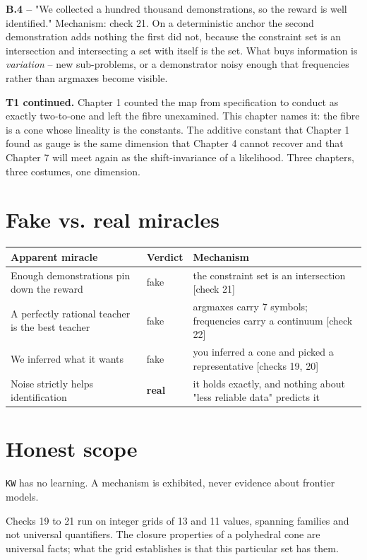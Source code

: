 \textbf{B.4 --} "We collected a hundred thousand demonstrations, so the reward is well identified." Mechanism: check 21. On a deterministic anchor the second demonstration adds nothing the first did not, because the constraint set is an intersection and intersecting a set with itself is the set. What buys information is \emph{variation} -- new sub-problems, or a demonstrator noisy enough that frequencies rather than argmaxes become visible.

\textbf{T1 continued.} Chapter 1 counted the map from specification to conduct as exactly two-to-one and left the fibre unexamined. This chapter names it: the fibre is a cone whose lineality is the constants. The additive constant that Chapter 1 found as gauge is the same dimension that Chapter 4 cannot recover and that Chapter 7 will meet again as the shift-invariance of a likelihood. Three chapters, three costumes, one dimension.

\section*{Fake vs. real miracles}

\noindent

\noindent
\begin{tabularx}{\textwidth}{XXX}
\toprule
Apparent miracle & Verdict & Mechanism \\
\midrule
Enough demonstrations pin down the reward & fake & the constraint set is an intersection [check 21] \\
A perfectly rational teacher is the best teacher & fake & argmaxes carry 7 symbols; frequencies carry a continuum [check 22] \\
We inferred what it wants & fake & you inferred a cone and picked a representative [checks 19, 20] \\
Noise strictly helps identification & \textbf{real} & it holds exactly, and nothing about "less reliable data" predicts it \\
\bottomrule
\end{tabularx}
\par\medskip

\section*{Honest scope}

\texttt{KW} has no learning. A mechanism is exhibited, never evidence about frontier models.

Checks 19 to 21 run on integer grids of 13 and 11 values, spanning families and not universal quantifiers. The closure properties of a polyhedral cone are universal facts; what the grid establishes is that this particular set has them.

